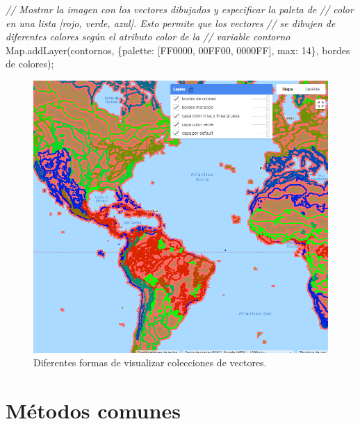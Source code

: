 \documentclass[
  12pt,
  letterpaper,
  twoside]{book}
\newenvironment{Shaded}{\begin{snugshade}}{\end{snugshade}}
\newcommand{\BuiltInTok}[1]{#1}
\newcommand{\CommentTok}[1]{\textcolor[rgb]{0.24,0.58,0.00}{\textit{#1}}}
\newcommand{\DataTypeTok}[1]{\textcolor[rgb]{0.00,0.00,0.00}{#1}}
\newcommand{\DecValTok}[1]{\textcolor[rgb]{0.28,0.53,0.93}{#1}}
\newcommand{\FunctionTok}[1]{\textcolor[rgb]{0.48,0.12,0.64}{#1}}
\newcommand{\NormalTok}[1]{#1}
\newcommand{\OperatorTok}[1]{\textcolor[rgb]{0.00,0.00,0.00}{#1}}
\newcommand{\StringTok}[1]{\textcolor[rgb]{0.87,0.29,0.22}{#1}}
\begin{document}
\begin{Shaded}
\begin{Highlighting}[]
\CommentTok{// Mostrar la imagen con los vectores dibujados y especificar la paleta de}
\CommentTok{// color en una lista [rojo, verde, azul]. Esto permite que los vectores }
\CommentTok{// se dibujen de diferentes colores según el atributo \textquotesingle{}color\textquotesingle{} de la }
\CommentTok{// variable \textquotesingle{}contorno\textquotesingle{}}
\BuiltInTok{Map}\OperatorTok{.}\FunctionTok{addLayer}\NormalTok{(contornos}\OperatorTok{,}\NormalTok{ \{}\DataTypeTok{palette}\OperatorTok{:}\NormalTok{ [}\StringTok{\textquotesingle{}FF0000\textquotesingle{}}\OperatorTok{,} \StringTok{\textquotesingle{}00FF00\textquotesingle{}}\OperatorTok{,} \StringTok{\textquotesingle{}0000FF\textquotesingle{}}\NormalTok{]}\OperatorTok{,} 
  \DataTypeTok{max}\OperatorTok{:} \DecValTok{14}\NormalTok{\}}\OperatorTok{,} \StringTok{\textquotesingle{}bordes de colores\textquotesingle{}}\NormalTok{)}\OperatorTok{;} 
\end{Highlighting}
\end{Shaded}

\begin{figure}[H]

{\centering \includegraphics[width=0.8\linewidth]{Img/ej17} 

}

\caption{Diferentes formas de visualizar colecciones de vectores.}\label{fig:f85}
\end{figure}
\newpage

\hypertarget{muxe9todos-comunes-2}{%
\section{Métodos comunes}\label{muxe9todos-comunes-2}}
\end{document}
